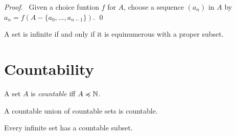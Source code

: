 \begin{proof}
    \pf\ Given a choice funtion $f$ for $A$, choose a sequence $(a_n)$ in $A$
    by $a_n = f(A - \{ a_0, \ldots, a_{n-1} \})$. \qed
\end{proof}

\begin{corollary}[AC]
    A set is infinite if and only if it is equinumerous with a proper subset.
\end{corollary}

\section{Countability}

\begin{definition}[Countable]
    A set $A$ is \emph{countable} iff $A \preccurlyeq \mathbb{N}$.
\end{definition}

\begin{theorem}[AC]
    A countable union of countable sets is countable.
\end{theorem}

\begin{proposition}[AC]
    Every infinite set has a countable subset.
\end{proposition}